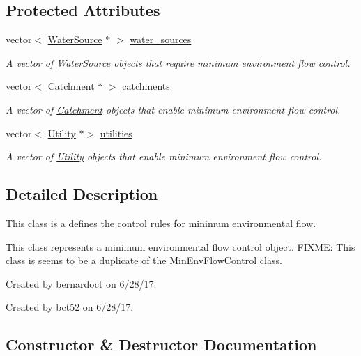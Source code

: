 \subsection*{Protected Attributes}
\begin{DoxyCompactItemize}
\item 
vector$<$ \mbox{\hyperlink{classWaterSource}{Water\+Source}} $\ast$ $>$ \mbox{\hyperlink{classMinEnvFlowControl_a36b50d0e6887b956051ae53bf5d2e3a9}{water\+\_\+sources}}
\begin{DoxyCompactList}\small\item\em A vector of \mbox{\hyperlink{classWaterSource}{Water\+Source}} objects that require minimum environment flow control. \end{DoxyCompactList}\item 
vector$<$ \mbox{\hyperlink{classCatchment}{Catchment}} $\ast$ $>$ \mbox{\hyperlink{classMinEnvFlowControl_a99502573f30daf84d9ad7a2f62197b77}{catchments}}
\begin{DoxyCompactList}\small\item\em A vector of \mbox{\hyperlink{classCatchment}{Catchment}} objects that enable minimum environment flow control. \end{DoxyCompactList}\item 
vector$<$ \mbox{\hyperlink{classUtility}{Utility}} $\ast$$>$ \mbox{\hyperlink{classMinEnvFlowControl_a1a0a309138b35e8199c205efb5fb5f80}{utilities}}
\begin{DoxyCompactList}\small\item\em A vector of \mbox{\hyperlink{classUtility}{Utility}} objects that enable minimum environment flow control. \end{DoxyCompactList}\end{DoxyCompactItemize}


\subsection{Detailed Description}
This class is a defines the control rules for minimum environmental flow. 

This class represents a minimum environmental flow control object. F\+I\+X\+ME\+: This class is seems to be a duplicate of the \mbox{\hyperlink{classMinEnvFlowControl}{Min\+Env\+Flow\+Control}} class.

Created by bernardoct on 6/28/17.

Created by bct52 on 6/28/17. 

\subsection{Constructor \& Destructor Documentation}
\mbox{\label{classMinEnvFlowControl_a093b292294d85f426c38deb6b7537d81}} 
